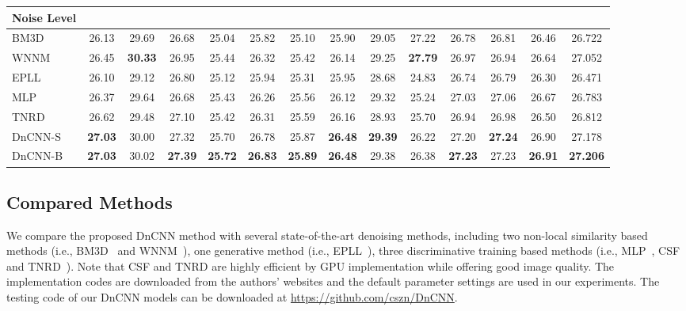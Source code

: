 \documentclass[journal]{IEEEtran}
\begin{document}
\begin{table*}[htbp]
\begin{tabular}{|l|c|c|c|c|c|c|c|c|c|c|c|c|c|}
     Noise Level& \multicolumn{13}{c|}{}   \\ \hline
    BM3D~\cite{dabov2007image} & 26.13 & 29.69 & 26.68 & 25.04 & 25.82 & 25.10 & 25.90 & 29.05 & 27.22 & 26.78 & 26.81 & 26.46 &  26.722  \\\hline
    WNNM~\cite{gu2014weighted}& 26.45 & \textbf{30.33} & 26.95 & 25.44 & 26.32 & 25.42 & 26.14 & 29.25 & \textbf{27.79} & 26.97 & 26.94 & 26.64 & 27.052   \\\hline
     EPLL~\cite{zoran2011learning}& 26.10 & 29.12 & 26.80 & 25.12 & 25.94 & 25.31 & 25.95 & 28.68 & 24.83 & 26.74 & 26.79 & 26.30 & 26.471   \\\hline
     MLP~\cite{burger2012image}& 26.37 & 29.64 & 26.68 & 25.43 & 26.26 & 25.56 & 26.12 & 29.32 & 25.24 & 27.03 & 27.06 & 26.67 &  26.783  \\\hline
     TNRD~\cite{chen2015trainable}& 26.62 & 29.48 & 27.10 & 25.42 & 26.31 & 25.59 & 26.16 & 28.93 & 25.70 & 26.94 & 26.98 & 26.50 & 26.812   \\\hline
     DnCNN-S& \textbf{27.03} & 30.00 & 27.32 & 25.70 & 26.78 & 25.87 & \textbf{26.48} & \textbf{29.39} & 26.22 & 27.20 & \textbf{27.24} & 26.90 &  27.178  \\\hline
     DnCNN-B & \textbf{27.03} & 30.02 & \textbf{27.39} & \textbf{25.72} & \textbf{26.83} & \textbf{25.89} & \textbf{26.48} & 29.38 & 26.38 & \textbf{27.23} & 27.23 & \textbf{26.91} &  \textbf{27.206}  \\\hline
\end{tabular}
\label{table888}
\end{table*}




\subsection{Compared Methods}

We compare the proposed DnCNN method with several state-of-the-art denoising methods, including two non-local similarity based methods (i.e., BM3D~\cite{dabov2007image} and WNNM~\cite{gu2014weighted}), one generative method (i.e., EPLL~\cite{zoran2011learning}), three discriminative training based methods (i.e., MLP~\cite{burger2012image}, CSF~\cite{schmidt2014shrinkage} and TNRD~\cite{chen2015trainable}). Note that CSF and TNRD are highly efficient by GPU implementation while offering good image quality. The implementation codes are downloaded from the authors' websites and the default parameter settings are used in our experiments.  The testing code of our DnCNN models can
be downloaded at \url{https://github.com/cszn/DnCNN}.
\end{document}
